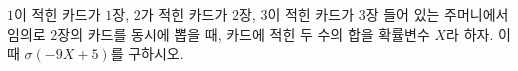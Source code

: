 $1$이 적힌 카드가 $1$장, $2$가 적힌 카드가 $2$장, $3$이 적힌 카드가 $3$장 들어 있는 주머니에서 임의로 $2$장의 카드를 동시에 뽑을 때, 카드에 적힌 두 수의 합을 확률변수 $X$라 하자. 이때 $\sigma(-9X+5)$를 구하시오.
